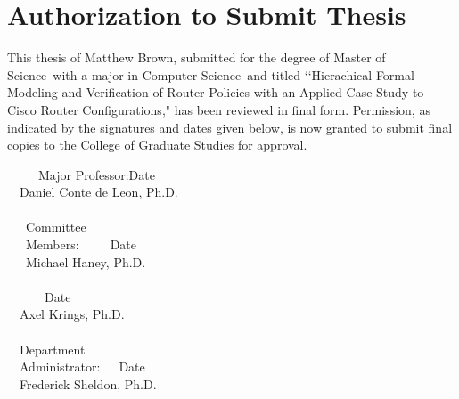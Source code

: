 \documentclass[12pt,letterpaper]{report}
\newcommand{\thesisTitle}{Hierachical Formal Modeling and Verification of Router Policies with an Applied Case Study to Cisco Router Configurations}
\newcommand{\myName}{Matthew Brown}
\newcommand{\degree}{Master of Science}
\newcommand{\major}{Computer Science}
\newcommand{\majorProf}{Daniel Conte de Leon}
\newcommand{\commiteMemA}{Michael Haney}
\newcommand{\commiteMemB}{Axel Krings}
\newcommand{\DeptAdmin}{Frederick Sheldon}
\begin{document}
\section*{\centering\large{Authorization to Submit Thesis}}
\begin{flushleft}
This thesis of \myName, submitted for the degree of \degree\ with a major in \major\ and titled \lq\lq \thesisTitle," has been reviewed in final form. Permission, as indicated by the signatures and dates given below, is now granted to submit final copies to the College of Graduate Studies for approval.
\end{flushleft}
\begin{singlespace} %
\vspace{.3cm}
\ \ \ \ \ Major Professor:\indent\underline{\makebox[2.8in][l]{\ }}Date\underline{\makebox[1.2in][l]{\ }}\\
\ \ \indent\indent\indent\indent\indent\indent\indent \majorProf, Ph.D.\\
\ \\
\ \ \ \indent Committee\\
\ \ \ \indent Members:\indent\indent\ \ \ \ \ \underline{\makebox[2.8in][l]{\ }}Date\underline{\makebox[1.2in][l]{\ }}\\
\vspace{.35cm}
\ \ \ \indent\indent\indent\indent\indent\indent \commiteMemA, Ph.D.\\
\ \\
\ \ \indent\indent\indent\indent\indent\indent\ \ \ \ \underline{\makebox[2.8in][l]{\ }}Date\underline{\makebox[1.2in][l]{\ }}\\
\ \ \indent\indent\indent\indent\indent\indent\indent \commiteMemB, Ph.D.\\
\ \\
\ \ \indent Department\\
\ \ \indent Administrator:\indent\ \ \ \underline{\makebox[2.8in][l]{\ }}Date\underline{\makebox[1.2in][l]{\ }}\\
\ \ \indent\indent\indent\indent\indent\indent\indent \DeptAdmin, Ph.D.\\
\end{singlespace}
\pagebreak
\end{document}
